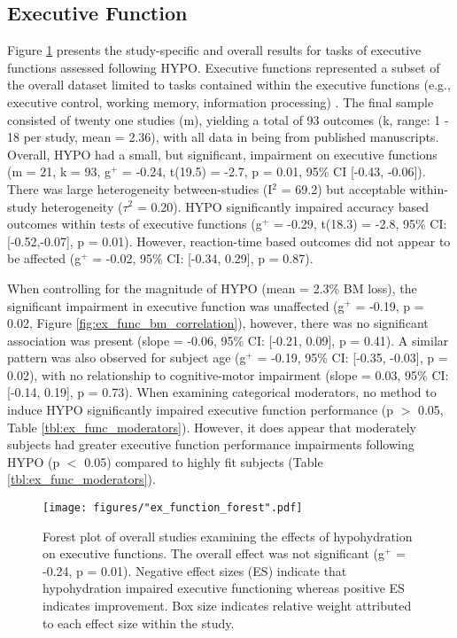 \subsection{Executive Function}
Figure \ref{fig:ex_func_ma} presents the study-specific and overall results for tasks of executive functions assessed following HYPO. Executive functions represented a subset of the overall dataset limited to tasks contained within the executive functions (e.g., executive control, working memory, information processing) \cite{shields_does_2015}. The final sample consisted of twenty one studies (m), yielding a total of 93 outcomes (k, range: 1 - 18 per study, mean = 2.36), with all data in being from published manuscripts. Overall, HYPO had a small, but significant, impairment on executive functions (m = 21, k = 93, g${^+}$ =  -0.24, t(19.5) = -2.7, p = 0.01, 95\% CI [-0.43, -0.06]). There was large heterogeneity between-studies (I${^2}$ = 69.2) but acceptable within-study heterogeneity (${\tau}$${^2}$ = 0.20). HYPO significantly impaired accuracy based outcomes within tests of executive functions (g${^+}$ = -0.29, t(18.3) = -2.8, 95\% CI: [-0.52,-0.07], p = 0.01). However, reaction-time based outcomes did not appear to be affected (g${^+}$ = -0.02, 95\% CI: [-0.34, 0.29], p = 0.87).

When controlling for the magnitude of HYPO (mean = 2.3\% BM loss), the significant impairment in executive function was unaffected (g${^+}$ =  -0.19, p = 0.02, Figure \ref{fig:ex_func_bm_correlation}), however, there was no significant association was present (slope = -0.06, 95\% CI: [-0.21, 0.09], p = 0.41). A similar pattern was also observed for subject age (g${^+}$ = -0.19, 95\% CI: [-0.35, -0.03], p = 0.02), with no relationship to cognitive-motor impairment (slope = 0.03, 95\% CI: [-0.14, 0.19], p = 0.73). When examining categorical moderators, no method to induce HYPO significantly impaired executive function performance (p ${>}$ 0.05, Table \ref{tbl:ex_func_moderators}). However, it does appear that moderately subjects had greater executive function performance impairments following HYPO (p ${<}$ 0.05) compared to highly fit subjects (Table \ref{tbl:ex_func_moderators}).

\begin{figure}
	\texttt{[image: figures/"ex\_function\_forest".pdf]}
	\caption{Forest plot of overall studies examining the effects of hypohydration on executive functions. The overall effect was not significant (g${^+}$ = -0.24, p = 0.01). Negative effect sizes (ES) indicate that hypohydration impaired executive functioning whereas positive ES indicates improvement. Box size indicates relative weight attributed to each effect size within the study.}
	\label{fig:ex_func_ma}
\end{figure}

